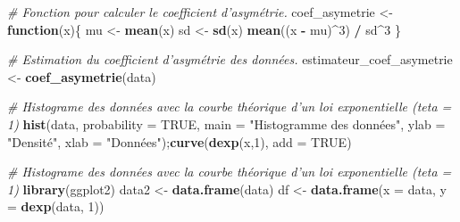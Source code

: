 \documentclass[]{article}
\newenvironment{Shaded}{\begin{snugshade}}{\end{snugshade}}
\newcommand{\KeywordTok}[1]{\textcolor[rgb]{0.13,0.29,0.53}{\textbf{#1}}}
\newcommand{\DataTypeTok}[1]{\textcolor[rgb]{0.13,0.29,0.53}{#1}}
\newcommand{\DecValTok}[1]{\textcolor[rgb]{0.00,0.00,0.81}{#1}}
\newcommand{\StringTok}[1]{\textcolor[rgb]{0.31,0.60,0.02}{#1}}
\newcommand{\CommentTok}[1]{\textcolor[rgb]{0.56,0.35,0.01}{\textit{#1}}}
\newcommand{\OtherTok}[1]{\textcolor[rgb]{0.56,0.35,0.01}{#1}}
\newcommand{\ControlFlowTok}[1]{\textcolor[rgb]{0.13,0.29,0.53}{\textbf{#1}}}
\newcommand{\OperatorTok}[1]{\textcolor[rgb]{0.81,0.36,0.00}{\textbf{#1}}}
\newcommand{\NormalTok}[1]{#1}
\begin{document}
\begin{Shaded}
\begin{Highlighting}[]
\CommentTok{# Fonction pour calculer le coefficient d'asymétrie.}
\NormalTok{coef_asymetrie <-}\StringTok{ }\ControlFlowTok{function}\NormalTok{(x)\{}
\NormalTok{    mu <-}\StringTok{ }\KeywordTok{mean}\NormalTok{(x)}
\NormalTok{    sd <-}\StringTok{ }\KeywordTok{sd}\NormalTok{(x)}
    \KeywordTok{mean}\NormalTok{((x }\OperatorTok{-}\StringTok{ }\NormalTok{mu)}\OperatorTok{^}\DecValTok{3}\NormalTok{) }\OperatorTok{/}\StringTok{ }\NormalTok{sd}\OperatorTok{^}\DecValTok{3} 
\NormalTok{\}}

\CommentTok{# Estimation du coefficient d'asymétrie des données.}
\NormalTok{estimateur_coef_asymetrie <-}\StringTok{ }\KeywordTok{coef_asymetrie}\NormalTok{(data)}

\CommentTok{# Histograme des données avec la courbe théorique d'un loi exponentielle (teta = 1)}
\KeywordTok{hist}\NormalTok{(data, }\DataTypeTok{probability =} \OtherTok{TRUE}\NormalTok{,}
     \DataTypeTok{main =} \StringTok{"Histogramme des données"}\NormalTok{,}
     \DataTypeTok{ylab =} \StringTok{"Densité"}\NormalTok{,}
     \DataTypeTok{xlab =} \StringTok{"Données"}\NormalTok{);}\KeywordTok{curve}\NormalTok{(}\KeywordTok{dexp}\NormalTok{(x,}\DecValTok{1}\NormalTok{), }\DataTypeTok{add =} \OtherTok{TRUE}\NormalTok{)}

\CommentTok{# Histograme des données avec la courbe théorique d'un loi exponentielle (teta = 1)}
\KeywordTok{library}\NormalTok{(ggplot2)}
\NormalTok{data2 <-}\StringTok{ }\KeywordTok{data.frame}\NormalTok{(data)}
\NormalTok{df <-}\StringTok{ }\KeywordTok{data.frame}\NormalTok{(}\DataTypeTok{x =}\NormalTok{ data, }\DataTypeTok{y =} \KeywordTok{dexp}\NormalTok{(data, }\DecValTok{1}\NormalTok{))}


\end{Highlighting}
\end{Shaded}
\end{document}
